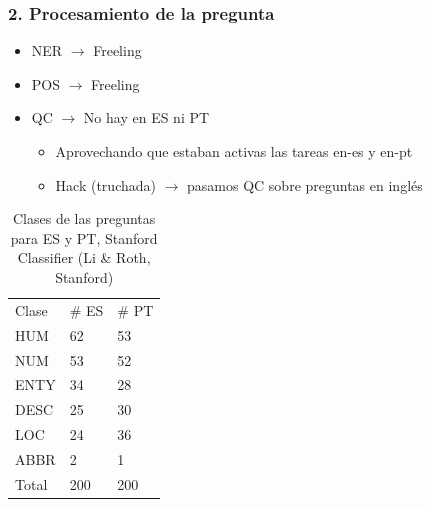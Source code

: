 \begin{frame}
\frametitle{2. Procesamiento de la pregunta}
  \begin{itemize}
    \item NER $\rightarrow$ Freeling
    \item POS $\rightarrow$ Freeling
    \item QC $\rightarrow$ No hay en ES ni PT
    \begin{itemize}
        \item Aprovechando que estaban activas las tareas en-es y en-pt
        \item Hack (truchada)  $\rightarrow$ pasamos QC sobre preguntas en inglés
    \end{itemize}
  \end{itemize}

  \begin{table}
    \centering
    \begin{center}
    \begin{tabular}{| l | l | l | }
    Clase & \# ES  & \# PT \\ 
    HUM &  62 & 53 \\ 
    NUM &  53 & 52\\ 
    ENTY &  34 & 28\\ 
    DESC &  25 & 30\\ 
    LOC &  24 & 36\\ 
    ABBR &  2 & 1\\ 
    Total & 200 & 200 \\
    \end{tabular}
    \caption{Clases de las preguntas para ES y PT, Stanford Classifier (Li \& Roth, Stanford)}
    \label{table:qc-es-pt}
    \end{center}
  \end{table}
\end{frame}





